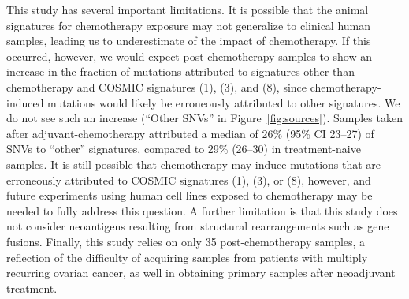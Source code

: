  

This study has several important limitations. It is possible that the animal signatures for chemotherapy exposure may not generalize to clinical human samples, leading us to underestimate of the impact of chemotherapy. If this occurred, however, we would expect post-chemotherapy samples to show an increase in the fraction of mutations attributed to signatures other than chemotherapy and COSMIC signatures (1), (3), and (8), since chemotherapy-induced mutations would likely be erroneously attributed to other signatures. We do not see such an increase (``Other SNVs'' in Figure~\ref{fig:sources}). Samples taken after adjuvant-chemotherapy attributed a median of 26\% (95\% CI 23--27) of SNVs to ``other'' signatures, compared to 29\% (26--30) in treatment-naive samples. It is still possible that chemotherapy may induce mutations that are erroneously attributed to COSMIC signatures (1), (3), or (8), however, and future experiments using human cell lines exposed to chemotherapy may be needed to fully address this question. A further limitation is that this study does not consider neoantigens resulting from structural rearrangements such as gene fusions. Finally, this study relies on only 35 post-chemotherapy samples, a reflection of the difficulty of acquiring samples from patients with multiply recurring ovarian cancer, as well in obtaining primary samples after neoadjuvant treatment.

